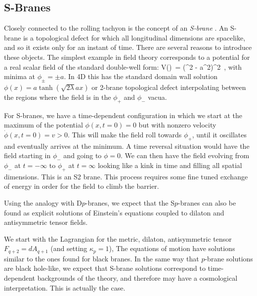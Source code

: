 \subsection{S-Branes}

 Closely connected to the rolling tachyon is the concept of an {\it S-brane} \cite{Gutperle:2002ai}. An S-brane is a topological defect for which 
all longitudinal dimensions are spacelike, and so it  exists
 only for an instant of time. There are several reasons to introduce these 
objects.  The simplest example  in field theory corresponds to 
a  potential for a real scalar field of the standard double-well form:
\be
V(\phi)\ = \lambda \left(\phi^2 - a^2\right)^2\ , 
\ee
with minima at $\phi_{\pm}=\pm a$. In 4D this has the standard domain wall solution $\phi(x)=a\tanh(\sqrt{2\lambda}ax)$  or 2-brane
topological defect interpolating between the regions where the field is in 
the
$\phi_+$ and $\phi_-$ vacua. 

For S-branes, we have a time-dependent configuration in which we start at the maximum 
of the potential  $\phi(x,t=0)=0$
but with nonzero velocity $\dot\phi(x,t=0)=v>0$. This will make the field  roll towards $\phi_+$, until it oscillates and eventually 
arrives at the minimum. A time reversal situation would have the field starting in $\phi_-$ and going to $\phi=0$. 
We can then have  the field evolving from $\phi_-$ at $t=-\infty$ to $\phi_+$ at $t=\infty$ looking like a kink in time and filling all spatial dimensions. This is an S2 brane. This  process requires some fine tuned exchange of energy in order for the field to climb the barrier.

Using the analogy with D$p$-branes, we expect that the S$p$-branes can
also be found as explicit solutions of Einstein's equations
 coupled to dilaton and antisymmetric tensor fields. 
 
We start with the Lagrangian for the metric, dilaton, antisymmetric tensor $F_{q+2}= 
dA_{q+1}$  (and setting $\kappa_p=1$),
\be
\setlength\fboxsep{0.25cm}
\setlength\fboxrule{0.4pt}
\ee
The equations of motion have solutions similar to the ones found for black branes. 
In the same way  that $p$-brane solutions
are black hole-like, we expect that S-brane solutions correspond to
time-dependent backgrounds of the theory, and therefore may have a  cosmological interpretation. This is actually the case. 

